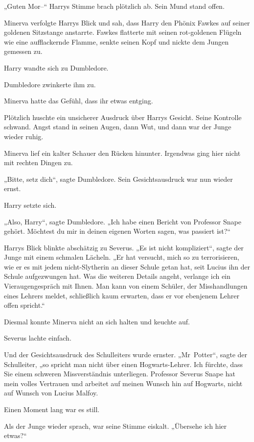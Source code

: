 {„Guten Mor--“ Harrys Stimme brach plötzlich ab. Sein Mund stand offen.

Minerva verfolgte Harrys Blick und sah, dass Harry den Phönix Fawkes auf seiner goldenen Sitzstange anstarrte. Fawkes flatterte mit seinen rot-goldenen Flügeln wie eine aufflackernde Flamme, senkte seinen Kopf und nickte dem Jungen gemessen zu.

Harry wandte sich zu Dumbledore.

Dumbledore zwinkerte ihm zu.

Minerva hatte das Gefühl, dass ihr etwas entging.

Plötzlich huschte ein unsicherer Ausdruck über Harrys Gesicht. Seine Kontrolle schwand. Angst stand in seinen Augen, dann Wut, und dann war der Junge wieder ruhig.

Minerva lief ein kalter Schauer den Rücken hinunter. Irgendwas ging hier nicht mit rechten Dingen zu.

„Bitte, setz dich“, sagte Dumbledore. Sein Gesichtsausdruck war nun wieder ernst.

Harry setzte sich.

„Also, Harry“, sagte Dumbledore. „Ich habe einen Bericht von Professor Snape gehört. Möchtest du mir in deinen eigenen Worten sagen, was passiert ist?“

Harrys Blick blinkte abschätzig zu Severus. „Es ist nicht kompliziert“, sagte der Junge mit einem schmalen Lächeln. „Er hat versucht, mich so zu terrorisieren, wie er es mit jedem nicht-Slytherin an dieser Schule getan hat, seit Lucius ihn der Schule aufgezwungen hat. Was die weiteren Details angeht, verlange ich ein Vieraugengespräch mit Ihnen. Man kann von einem Schüler, der Misshandlungen eines Lehrers meldet, schließlich kaum erwarten, dass er vor ebenjenem Lehrer offen spricht.“

Diesmal konnte Minerva nicht an sich halten und keuchte auf.

Severus lachte einfach.

Und der Gesichtsausdruck des Schulleiters wurde ernster. „Mr~Potter“, sagte der Schulleiter, „so spricht man nicht über einen Hogwarts-Lehrer. Ich fürchte, dass Sie einem schweren Missverständnis unterliegen. Professor Severus Snape hat mein volles Vertrauen und arbeitet auf meinen Wunsch hin auf Hogwarts, nicht auf Wunsch von Lucius Malfoy.

Einen Moment lang war es still.

Als der Junge wieder sprach, war seine Stimme eiskalt. „Übersehe ich hier etwas?“

}
